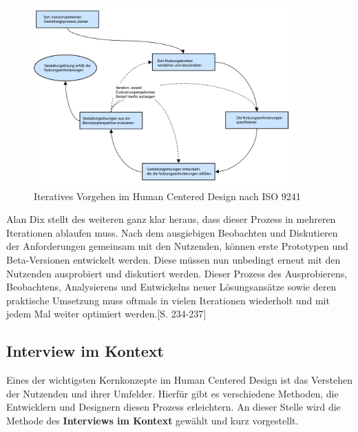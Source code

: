 \documentclass[12pt]{article}
\begin{document}
\begin{figure}[h]
    \caption{Iteratives Vorgehen im Human Centered Design nach ISO 9241 \cite{iso9241}}
    \centering
    \includegraphics[width=10cm]{HCD.png}
\end{figure}

Alan Dix stellt des weiteren ganz klar heraus, dass dieser Prozess in mehreren
Iterationen ablaufen muss. Nach dem ausgiebigen Beobachten und Diskutieren der
Anforderungen gemeinsam mit den Nutzenden, können erste Prototypen und
Beta-Versionen entwickelt werden. Diese müssen nun unbedingt erneut mit den
Nutzenden ausprobiert und diskutiert werden. Dieser Prozess des Ausprobierens,
Beobachtens, Analysierens und Entwickelns neuer Lösungsansätze sowie deren
praktische Umsetzung muss oftmals in vielen Iterationen wiederholt und mit
jedem Mal weiter optimiert werden.\cite{hci}[S. 234-237]

\subsection{Interview im Kontext}
Eines der wichtigsten Kernkonzepte im Human Centered Design ist das Verstehen
der Nutzenden und ihrer Umfelder. Hierfür gibt es verschiedene Methoden, die
Entwicklern und Designern diesen Prozess erleichtern. An dieser Stelle wird die
Methode des\textbf{ Interviews im Kontext} gewählt und kurz vorgestellt.
\end{document}
